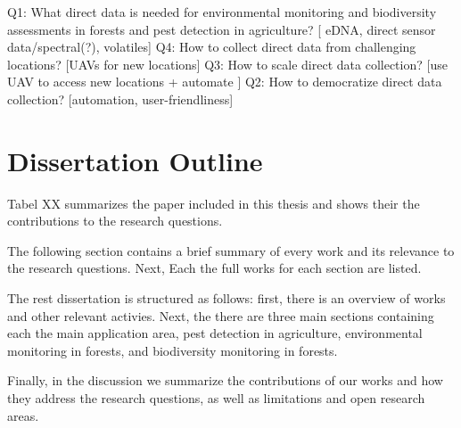 
Q1: What direct data is needed for environmental monitoring and biodiversity assessments in forests and pest detection in agriculture? [ eDNA, direct sensor data/spectral(?), volatiles]
Q4: How to collect direct data from challenging locations? [UAVs for new locations]
Q3: How to scale direct data collection? [use UAV to access new locations + automate ]
Q2: How to democratize direct data collection? [automation, user-friendliness]


\section{Dissertation Outline}

Tabel XX summarizes the paper included in this thesis and shows their the contributions to the research questions. 

The following section contains a brief summary of every work and its relevance to the research questions. Next, Each the full works for each section are listed.

The rest dissertation is structured as follows: first, there is an overview of works and other relevant activies. Next, the there are three main sections containing each the main application area, pest detection in agriculture, environmental monitoring in forests, and biodiversity monitoring in forests. 

Finally, in the discussion we summarize the contributions of our works and how they address the research questions, as well as limitations and open research areas. 



